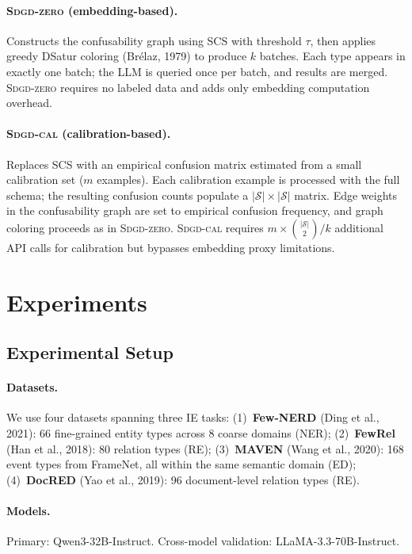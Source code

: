 \documentclass[11pt,a4paper]{article}
\newcommand{\sdgdzero}{\textsc{Sdgd-zero}}
\newcommand{\sdgdcal}{\textsc{Sdgd-cal}}
\begin{document}
\paragraph{\sdgdzero{} (embedding-based).}
Constructs the confusability graph using SCS with threshold $\tau$, then applies greedy DSatur coloring (Br\'{e}laz, 1979) to produce $k$ batches.
Each type appears in exactly one batch; the LLM is queried once per batch, and results are merged.
\sdgdzero{} requires no labeled data and adds only embedding computation overhead.

\paragraph{\sdgdcal{} (calibration-based).}
Replaces SCS with an empirical confusion matrix estimated from a small calibration set ($m$ examples).
Each calibration example is processed with the full schema; the resulting confusion counts populate a $|\mathcal{S}| \times |\mathcal{S}|$ matrix.
Edge weights in the confusability graph are set to empirical confusion frequency, and graph coloring proceeds as in \sdgdzero{}.
\sdgdcal{} requires $m \times \binom{|\mathcal{S}|}{2}/k$ additional API calls for calibration but bypasses embedding proxy limitations.


\section{Experiments}
\label{sec:experiments}

\subsection{Experimental Setup}
\label{sec:setup-exp}

\paragraph{Datasets.}
We use four datasets spanning three IE tasks:
(1)~\textbf{Few-NERD} (Ding et al., 2021): 66 fine-grained entity types across 8 coarse domains (NER);
(2)~\textbf{FewRel} (Han et al., 2018): 80 relation types (RE);
(3)~\textbf{MAVEN} (Wang et al., 2020): 168 event types from FrameNet, all within the same semantic domain (ED);
(4)~\textbf{DocRED} (Yao et al., 2019): 96 document-level relation types (RE).

\paragraph{Models.}
Primary: Qwen3-32B-Instruct. Cross-model validation: LLaMA-3.3-70B-Instruct.
\end{document}

